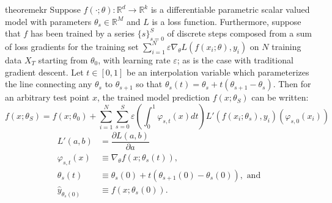 \begin{restatable}{theorem}{ekr}
\label{thm:ekr}
Suppose $f(\cdot; \theta): \mathbb{R}^d \rightarrow \mathbb{R}^k$ is a differentiable parametric scalar valued model with parameters $\theta_s \in \mathbb{R}^M$ and $L$ is a loss function. Furthermore, suppose that $f$ has been trained by a series $\{s\}_{s=0}^S$ of discrete steps composed from a sum of loss gradients for the training set $ \sum_{i=1}^N \varepsilon \nabla_\theta L(f(x_i; \theta), y_i)$ on $N$ training data $X_T$ starting from $\theta_0$, with learning rate $\varepsilon$; as is the case with traditional gradient descent. Let $t \in [0, 1]$ be an interpolation variable which parameterizes the line connecting any $\theta_s$ to $\theta_{s+1}$ so that $\theta_s(t) = \theta_s + t(\theta_{s+1} - \theta_s)$. Then for an arbitrary test point $x$, the trained model prediction $f(x; \theta_S)$ can be written:
\begin{equation}
f(x; \theta_S) = f(x; \theta_0) + \sum_{i=1}^N \sum_{s=0}^S \varepsilon \left(\int_0^1 \varphi_{s,t}(x) dt\right) L'(f(x_i; \theta_s), y_i) \left(\varphi_{s, 0}(x_i)\right)
\label{exact}
\end{equation}
\begin{align}
    L'(a, b) &= \dfrac{\partial L(a, b)}{\partial a}\\
    \varphi_{s,t}(x) &\equiv \nabla_\theta f(x; \theta_s(t)), \\
    \theta_s(t) &\equiv \theta_s(0) + t(\theta_{s+1}(0)-\theta_s(0)), \text{ and}\\
    \hat y_{\theta_s(0)} &\equiv f(x; \theta_s(0)).
\end{align}
\end{restatable}
\vspace{-0.25cm}
